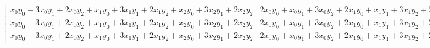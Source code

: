 \documentclass[12pt]{article}
\begin{document}
$\left[\begin{smallmatrix}x_{0} y_{0} + 3 x_{0} y_{1} + 2 x_{0} y_{2} + x_{1} y_{0} + 3 x_{1} y_{1} + 2 x_{1} y_{2} + x_{2} y_{0} + 3 x_{2} y_{1} + 2 x_{2} y_{2} & 2 x_{0} y_{0} + x_{0} y_{1} + 3 x_{0} y_{2} + 2 x_{1} y_{0} + x_{1} y_{1} + 3 x_{1} y_{2} + 2 x_{2} y_{0} + x_{2} y_{1} + 3 x_{2} y_{2} & 3 x_{0} y_{0} + 2 x_{0} y_{1} + x_{0} y_{2} + 3 x_{1} y_{0} + 2 x_{1} y_{1} + x_{1} y_{2} + 3 x_{2} y_{0} + 2 x_{2} y_{1} + x_{2} y_{2}\\x_{0} y_{0} + 3 x_{0} y_{1} + 2 x_{0} y_{2} + x_{1} y_{0} + 3 x_{1} y_{1} + 2 x_{1} y_{2} + x_{2} y_{0} + 3 x_{2} y_{1} + 2 x_{2} y_{2} & 2 x_{0} y_{0} + x_{0} y_{1} + 3 x_{0} y_{2} + 2 x_{1} y_{0} + x_{1} y_{1} + 3 x_{1} y_{2} + 2 x_{2} y_{0} + x_{2} y_{1} + 3 x_{2} y_{2} & 3 x_{0} y_{0} + 2 x_{0} y_{1} + x_{0} y_{2} + 3 x_{1} y_{0} + 2 x_{1} y_{1} + x_{1} y_{2} + 3 x_{2} y_{0} + 2 x_{2} y_{1} + x_{2} y_{2}\\x_{0} y_{0} + 3 x_{0} y_{1} + 2 x_{0} y_{2} + x_{1} y_{0} + 3 x_{1} y_{1} + 2 x_{1} y_{2} + x_{2} y_{0} + 3 x_{2} y_{1} + 2 x_{2} y_{2} & 2 x_{0} y_{0} + x_{0} y_{1} + 3 x_{0} y_{2} + 2 x_{1} y_{0} + x_{1} y_{1} + 3 x_{1} y_{2} + 2 x_{2} y_{0} + x_{2} y_{1} + 3 x_{2} y_{2} & 3 x_{0} y_{0} + 2 x_{0} y_{1} + x_{0} y_{2} + 3 x_{1} y_{0} + 2 x_{1} y_{1} + x_{1} y_{2} + 3 x_{2} y_{0} + 2 x_{2} y_{1} + x_{2} y_{2}\end{smallmatrix}\right]$
\end{document}
